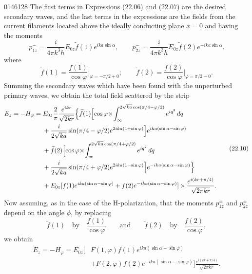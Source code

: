 \begin{scanpage}{0146}{128}
The first terms in Expressions (22.06) and (22.07) are the desired secondary waves, and the last terms in the expressions are the fields from the current filaments located above the ideally conducting plane $x=0$ and having the moments
\[
p_{1z}^-=\frac{i}{4\pi k^3h}E_{0z}\widetilde f(1)e^{ika\sin\alpha},\qquad p_{2z}^-=\frac{i}{4\pi k^3h}E_{0z}\widetilde f(2)e^{-ika\sin\alpha}.\tag{22.08}
\]
where
\[
\widetilde f(1)=\frac{f(1)}{\cos\varphi}\bigg|_{\varphi=-\pi/2+0};\qquad\widetilde f(2)=\frac{f(2)}{\cos\varphi}\bigg|_{\varphi=\pi/2-0}.\tag{22.09}
\]
Summing the secondary waves which have been found with the unperturbed primary waves, we obtain the total field scattered by the strip
\[
\begin{aligned}E_z=-H_\varphi={}&E_{0z}\frac2\pi\frac{e^{ikr}}{\sqrt{2kr}}\Bigl\{\widetilde f(1)\Bigl[\cos\varphi\!\times\!\int_\infty^{2\sqrt{ka}\cos(\pi/4-\varphi/2)}e^{iq^2}\,dq\\
&+\frac{i}{2\sqrt{ka}}\sin(\pi/4-\varphi/2)e^{2ika(1+\sin\varphi)}\Bigr]e^{ika(\sin\alpha-\sin\varphi)}\\
&+\widetilde f(2)\Bigl[\cos\varphi\!\times\!\int_\infty^{2\sqrt{ka}\cos(\pi/4+\varphi/2)}e^{iq^2}\,dq\\
&+\frac{i}{2\sqrt{ka}}\sin(\pi/4+\varphi/2)e^{2ika(1-\sin\varphi)}\Bigr]e^{-ika(\sin\alpha-\sin\varphi)}\Bigr\}\\
&+E_{0z}[f(1)e^{ika(\sin\alpha-\sin\varphi)}+f(2)e^{-ika(\sin\alpha-\sin\varphi)}]\times\frac{e^{i(kr+\pi/4)}}{\sqrt{2\pi kr}}.
\end{aligned}\tag{22.10}
\]
Now assuming, as in the case of the H-polarization, that the moments $p_{1z}^{\pm}$ and $p_{2z}^{\pm}$ depend on the angle $\phi$, by replacing
\[
\widetilde f(1)\quad\text{by}\quad\frac{f(1)}{\cos\varphi}\qquad\text{and}\qquad\widetilde f(2)\quad\text{by}\quad\frac{f(2)}{\cos\varphi},\tag{22.11}
\]
we obtain
\[
\begin{aligned}E_z=-H_\varphi=E_{0z}\bigl[&F(1,\varphi)f(1)e^{ika(\sin\alpha-\sin\varphi)}\\&+F(2,\varphi)f(2)e^{-ika(\sin\alpha-\sin\varphi)}\bigr]\frac{e^{i(kr+\pi/4)}}{\sqrt{2\pi kr}}.
\end{aligned}\tag{22.12}
\]
\end{scanpage}
